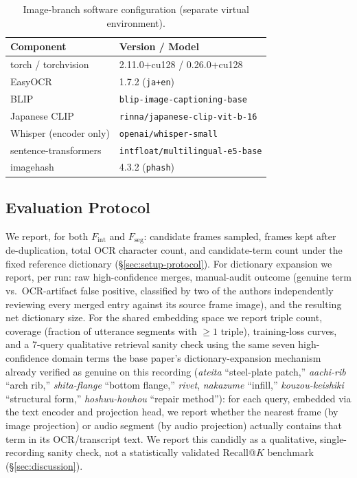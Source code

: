 ﻿\documentclass[twocolumn]{article}
\begin{document}
\begin{table}[t]
\centering
\caption{Image-branch software configuration (separate virtual environment).}
\label{tab:software2}
\scriptsize
\begin{tabular}{ll}
\toprule
Component & Version / Model \\
\midrule
torch / torchvision & 2.11.0+cu128 / 0.26.0+cu128 \\
EasyOCR & 1.7.2 (\texttt{ja+en}) \\
BLIP & \texttt{blip-image-captioning-base} \\
Japanese CLIP & \texttt{rinna/japanese-clip-vit-b-16} \\
Whisper (encoder only) & \texttt{openai/whisper-small} \\
sentence-transformers & \texttt{intfloat/multilingual-e5-base} \\
imagehash & 4.3.2 (\texttt{phash}) \\
\bottomrule
\end{tabular}
\end{table}

\subsection{Evaluation Protocol}

We report, for both $F_{\text{int}}$ and $F_{\text{seg}}$: candidate frames sampled, frames kept
after de-duplication, total OCR character count, and candidate-term count under the fixed reference
dictionary (\S\ref{sec:setup-protocol}). For dictionary expansion we report, per run: raw
high-confidence merges, manual-audit outcome (genuine term vs.\ OCR-artifact false positive,
classified by two of the authors independently reviewing every merged entry against its source
frame image), and the resulting net dictionary size. For the shared embedding space we report
triple count, coverage (fraction of utterance segments with $\geq 1$ triple), training-loss curves,
and a 7-query qualitative retrieval sanity check using the same seven high-confidence domain terms
the base paper's dictionary-expansion mechanism already verified as genuine on this recording
(\textit{ateita} ``steel-plate patch,'' \textit{aachi-rib} ``arch rib,'' \textit{shita-flange}
``bottom flange,'' \textit{rivet}, \textit{nakazume} ``infill,'' \textit{kouzou-keishiki}
``structural form,'' \textit{hoshuu-houhou} ``repair method''): for each query, embedded via the
text encoder and projection head, we report whether the nearest frame (by image projection) or
audio segment (by audio projection) actually contains that term in its OCR/transcript text. We
report this candidly as a qualitative, single-recording sanity check, not a statistically validated
Recall@$K$ benchmark (\S\ref{sec:discussion}).
\end{document}
